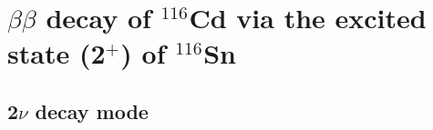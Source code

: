 \documentclass[main.tex]{subfiles}
\begin{document}



\FloatBarrier


\section{$\beta\beta$ decay of $^{\text{116}}$Cd via the excited state (2$^+$) of $^{\text{116}}$Sn}\label{sec:Result2PLUS}

\subsection{2$\nu$ decay mode}
\end{document}
